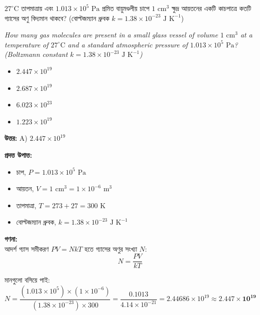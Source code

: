 \documentclass[12pt, a4paper]{article}
\begin{document}
\begin{tcolorbox}[questionbox={প্রশ্ন (Question) 21}]
    \noindent
    $27^\circ\text{C}$ তাপমাত্রায় এবং $1.013 \times 10^5\text{ Pa}$ প্রমিত বায়ুমণ্ডলীয় চাপে $1\text{ cm}^3$ ক্ষুদ্র আয়তনের একটি কাচপাত্রে কতটি গ্যাসের অণু বিদ্যমান থাকবে? (বোল্টজম্যান ধ্রুবক $k = 1.38 \times 10^{-23}\text{ J K}^{-1}$)
    
    \vspace{0.8em}
    \begin{english}
    \noindent\textit{\color{darkgray}
    How many gas molecules are present in a small glass vessel of volume $1\text{ cm}^3$ at a temperature of $27^\circ\text{C}$ and a standard atmospheric pressure of $1.013 \times 10^5\text{ Pa}$? (Boltzmann constant $k = 1.38 \times 10^{-23}\text{ J K}^{-1}$)
    }
    \end{english}
\end{tcolorbox}

\begin{itemize}[label={}, leftmargin=1cm, itemsep=0.5em]
    \item[\textbf{A)}] $2.447 \times 10^{19}$
    \item[\textbf{B)}] $2.687 \times 10^{19}$
    \item[\textbf{C)}] $6.023 \times 10^{23}$
    \item[\textbf{D)}] $1.223 \times 10^{19}$
\end{itemize}

\vspace{0.5em}
\begin{tcolorbox}[answerbox]
    \textbf{\color{success} উত্তর:} A) $2.447 \times 10^{19}$
\end{tcolorbox}
\vspace{1em}

\begin{tcolorbox}[solutionbox={সমাধান (Solution)}]
    \noindent
    \textbf{প্রদত্ত উপাত্ত:}
    \begin{itemize}[leftmargin=1.5em, itemsep=0.2em]
        \item চাপ, $P = 1.013 \times 10^5\text{ Pa}$
        \item আয়তন, $V = 1\text{ cm}^3 = 1 \times 10^{-6}\text{ m}^3$
        \item তাপমাত্রা, $T = 273 + 27 = 300\text{ K}$
        \item বোল্টজম্যান ধ্রুবক, $k = 1.38 \times 10^{-23}\text{ J K}^{-1}$
    \end{itemize}

    \vspace{0.6em}
    \noindent\textbf{গণনা:} \\
    আদর্শ গ্যাস সমীকরণ $P V = N k T$ হতে গ্যাসের অণুর সংখ্যা $N$:
    \[ N = \frac{P V}{k T} \]
    
    মানগুলো বসিয়ে পাই:
    \[ N = \frac{(1.013 \times 10^5) \times (1 \times 10^{-6})}{(1.38 \times 10^{-23}) \times 300} = \frac{0.1013}{4.14 \times 10^{-21}} = 2.44686 \times 10^{19} \approx \mathbf{2.447 \times 10^{19}} \]
\end{tcolorbox}
\end{document}
